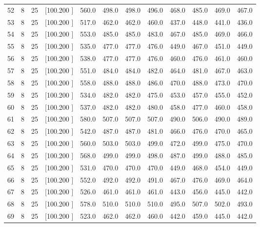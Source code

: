 \documentclass[12pt,a4paper]{article}
\begin{document}
\begin{center}
{\begin{tabular}{r r r r r r r r r r r r}
  52&  8& 25&[100.200   ]&   560.0&   498.0&   498.0&   496.0&   468.0&   485.0&   469.0&   467.0\\[-0.02in]
  53&  8& 25&[100.200   ]&   517.0&   462.0&   462.0&   460.0&   437.0&   448.0&   441.0&   436.0\\[-0.02in]
  54&  8& 25&[100.200   ]&   553.0&   485.0&   485.0&   483.0&   467.0&   485.0&   469.0&   466.0\\[-0.02in]
  55&  8& 25&[100.200   ]&   535.0&   477.0&   477.0&   476.0&   449.0&   467.0&   451.0&   449.0\\[-0.02in]
  56&  8& 25&[100.200   ]&   538.0&   477.0&   477.0&   476.0&   460.0&   476.0&   461.0&   460.0\\[-0.02in]
  57&  8& 25&[100.200   ]&   551.0&   484.0&   484.0&   482.0&   464.0&   481.0&   467.0&   463.0\\[-0.02in]
  58&  8& 25&[100.200   ]&   558.0&   488.0&   488.0&   486.0&   470.0&   488.0&   473.0&   470.0\\[-0.02in]
  59&  8& 25&[100.200   ]&   534.0&   482.0&   482.0&   475.0&   453.0&   457.0&   455.0&   452.0\\[-0.02in]
  60&  8& 25&[100.200   ]&   537.0&   482.0&   482.0&   480.0&   458.0&   477.0&   460.0&   458.0\\[-0.02in]
  61&  8& 25&[100.200   ]&   580.0&   507.0&   507.0&   507.0&   490.0&   506.0&   490.0&   489.0\\[-0.02in]
  62&  8& 25&[100.200   ]&   542.0&   487.0&   487.0&   481.0&   466.0&   476.0&   470.0&   465.0\\[-0.02in]
  63&  8& 25&[100.200   ]&   560.0&   503.0&   503.0&   499.0&   472.0&   499.0&   475.0&   470.0\\[-0.02in]
  64&  8& 25&[100.200   ]&   568.0&   499.0&   499.0&   498.0&   487.0&   499.0&   488.0&   485.0\\[-0.02in]
  65&  8& 25&[100.200   ]&   531.0&   470.0&   470.0&   470.0&   449.0&   468.0&   454.0&   449.0\\[-0.02in]
  66&  8& 25&[100.200   ]&   552.0&   492.0&   492.0&   491.0&   467.0&   476.0&   469.0&   464.0\\[-0.02in]
  67&  8& 25&[100.200   ]&   526.0&   461.0&   461.0&   461.0&   443.0&   456.0&   445.0&   442.0\\[-0.02in]
  68&  8& 25&[100.200   ]&   578.0&   510.0&   510.0&   510.0&   495.0&   507.0&   502.0&   493.0\\[-0.02in]
  69&  8& 25&[100.200   ]&   523.0&   462.0&   462.0&   460.0&   442.0&   459.0&   445.0&   442.0\\[-0.02in]

\end{tabular}}
\end{center}
\end{document}
